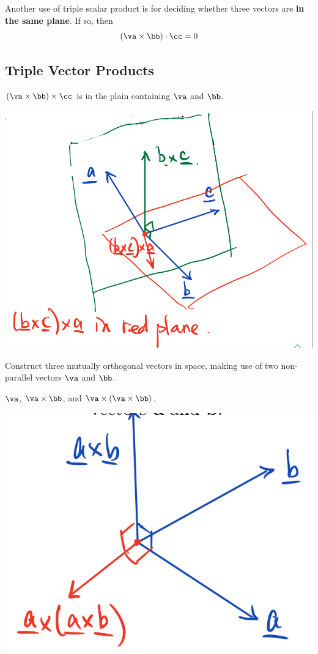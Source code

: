 \begin{spacing}{1.3}
    Another use of triple scalar product is for deciding whether three 
    vectors are {\bf in the same plane}. If so, then $$(\va\times \bb)\cdot \cc=0$$

    \subsection{Triple Vector Products}

    $(\va\times \bb)\times \cc$ is in the plain containing $\va$ and $\bb$.
    \begin{center}
        \includegraphics[scale=0.25]{images/Ch10-triple-cross-prod.jpeg}
    \end{center}

    \eg Construct three mutually orthogonal vectors in space, making use of 
    two non-parallel vectors $\va$ and $\bb$.

    \sol $\va$, $\va\times \bb$, and $\va\times(\va\times \bb)$.
    \begin{center}
        \includegraphics[scale=0.27]{images/Ch10-mutually-orth.jpeg}
    \end{center}


\end{spacing}
